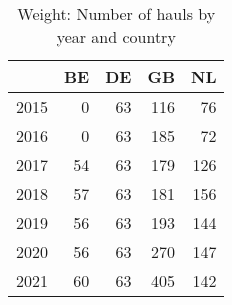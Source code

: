 \begin{table}[ht]
\centering
\begin{tabular}{rrrrr}
  \hline
 & BE & DE & GB & NL \\ 
  \hline
2015 & 0 & 63 & 116 & 76 \\ 
  2016 & 0 & 63 & 185 & 72 \\ 
  2017 & 54 & 63 & 179 & 126 \\ 
  2018 & 57 & 63 & 181 & 156 \\ 
  2019 & 56 & 63 & 193 & 144 \\ 
  2020 & 56 & 63 & 270 & 147 \\ 
  2021 & 60 & 63 & 405 & 142 \\ 
   \hline
\end{tabular}
\caption{Weight: Number of hauls by year and country} 
\end{table}
